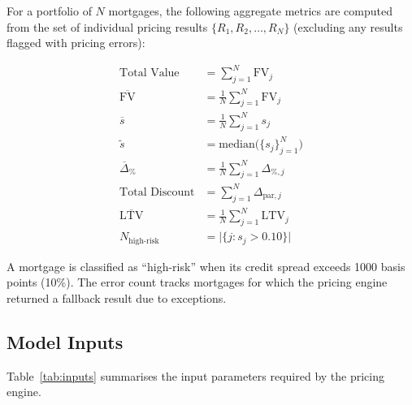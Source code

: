 \documentclass[11pt,a4paper]{article}
\begin{document}
For a portfolio of $N$ mortgages, the following aggregate metrics are computed from
the set of individual pricing results $\{R_1, R_2, \ldots, R_N\}$ (excluding any
results flagged with pricing errors):

\begin{align}
\text{Total Value} &= \sum_{j=1}^{N} \text{FV}_j \label{eq:port_value} \\
\overline{\text{FV}} &= \frac{1}{N} \sum_{j=1}^{N} \text{FV}_j \label{eq:avg_value} \\
\overline{s} &= \frac{1}{N} \sum_{j=1}^{N} s_j \label{eq:avg_spread} \\
\tilde{s} &= \text{median}\!\bigl(\{s_j\}_{j=1}^{N}\bigr) \label{eq:med_spread} \\
\overline{\Delta}_{\%} &= \frac{1}{N} \sum_{j=1}^{N} \Delta_{\%,j} \label{eq:avg_disc} \\
\text{Total Discount} &= \sum_{j=1}^{N} \Delta_{\text{par},j} \label{eq:tot_disc} \\
\overline{\text{LTV}} &= \frac{1}{N} \sum_{j=1}^{N} \text{LTV}_j \label{eq:avg_ltv} \\
N_{\text{high-risk}} &= \bigl|\{j : s_j > 0.10\}\bigr| \label{eq:high_risk}
\end{align}

\noindent A mortgage is classified as ``high-risk'' when its credit spread exceeds
1000 basis points (10\%). The error count tracks mortgages for which the pricing engine
returned a fallback result due to exceptions.

\mkminputs

\subsection{Model Inputs}

Table~\ref{tab:inputs} summarises the input parameters required by the pricing engine.
\end{document}
